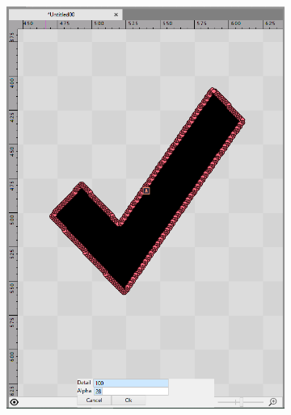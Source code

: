 \documentclass{fefu_thesis/cls/fefu}
\begin{document}
    \begin{figure}[H]
        \centering
        \begin{subfigure}{.32\linewidth}
            \centering
            \includegraphics[scale=0.25]{images/Check100.png}
        \end{subfigure}
        \begin{subfigure}{.32\linewidth}
            \centering

\end{subfigure}
\end{figure}
\end{document}
